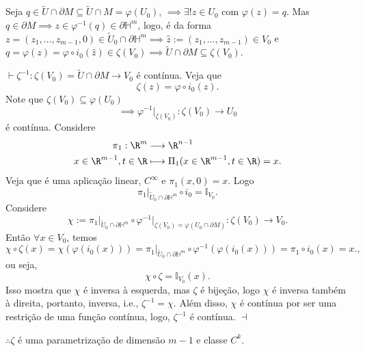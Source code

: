     \begin{remark}
	Seja $q\in \widetilde{U} \cap \partial M \subseteq \widetilde{U} \cap M = \varphi \left( U_0 \right) $, $\implies \exists ! z\in U_0$ com $\varphi \left( z \right) =q$. Mas $q\in \partial M \implies z\in \varphi ^{-1}\left( q \right) \in \partial \mathbb{H}^{m}$, logo, é da forma $z=\left( z_1,\ldots,z_{m-1},0 \right) \in \widetilde{U}_0 \cap \partial \mathbb{H}^{m} \implies \hat{z} := \left( z_1,\ldots,z_{m-1} \right) \in V_0 $ e $q = \varphi \left( z \right) = \varphi \circ i_0\left( \hat{z}   \right) \in \zeta\left( V_0 \right) \implies \widetilde{U}\cap \partial M \subseteq \zeta\left( V_0 \right) $.
    \end{remark}

$\vdash \zeta^{-1} : \zeta\left( V_0 \right) = \widetilde{U}\cap \partial M \longrightarrow V_0$ é contínua. Veja que \[
\zeta \left( z \right) = \varphi \circ i_0\left( z \right) 
.\] Note que $\zeta \left( V_0 \right) \subseteq \varphi \left( U_0 \right) $ \[
\implies \varphi ^{-1}\Big|_{\zeta\left( V_0 \right) } : \zeta\left( V_0 \right)  \longrightarrow U_0
\] é contínua. Considere
\begin{align*}
    \pi_1: \R^{m} &\longrightarrow \R^{n-1} \\
    x\in \R^{m-1},t\in \R &\longmapsto \Pi_1(x\in \R^{m-1},t\in \R) = x
.\end{align*}
Veja que é uma aplicação linear, $C^{\infty}$ e $\pi_1\left( x,0 \right) = x$. Logo \[
\pi_1\Big|_{\widetilde{U}_0 \cap \partial \mathbb{H}^{m}} \circ i_0 = \mathbb{I}_{V_0}
.\] Considere \[
\chi := \pi_1\Big|_{\widetilde{U}_0\cap \partial \mathbb{H}^{m}} \circ \varphi ^{-1}\Big|_{\zeta\left( V_0 \right) = \varphi \left( U_0\cap \partial M \right) }: \zeta\left( V_0 \right)  \longrightarrow V_0
.\] Então $\forall x\in V_0$, temos \[
\chi \circ \zeta\left( x \right) = \chi \left( \varphi \left( i_0\left( x \right)  \right)  \right) = \pi_1\Big|_{\widetilde{U}_0\cap \partial \mathbb{H}^{m}} \circ \varphi ^{-1} \left( \varphi \left( i_0\left( x \right)  \right)  \right) = \pi_1 \circ i_0 \left( x \right) = x.
,\] ou seja, \[
\chi \circ \zeta = \mathbb{I}_{V_0}\left( x \right) 
.\] Isso mostra que $\chi$ é inversa à esquerda, mas $\zeta$ é bijeção, logo $\chi$ é inversa também à direita, portanto, inversa, i.e., $\zeta^{-1} = \chi$. Além disso, $\chi$ é contínua por ser uma restrição de uma função contínua, logo, $\zeta^{-1}$ é contínua. $\dashv$

$\therefore\zeta$ é uma parametrização de dimensão $m-1$ e classe $C^{k}$.

